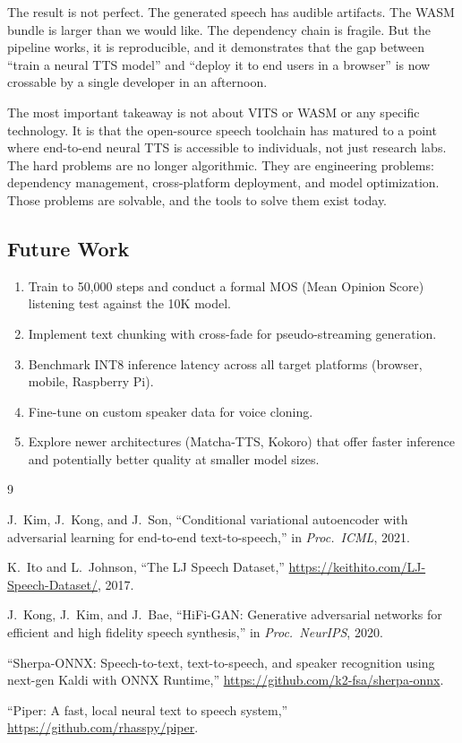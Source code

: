 \documentclass[10pt,a4paper,twocolumn]{article}
\begin{document}
The result is not perfect. The generated speech has audible artifacts. The WASM bundle is larger than we would like. The dependency chain is fragile. But the pipeline works, it is reproducible, and it demonstrates that the gap between ``train a neural TTS model'' and ``deploy it to end users in a browser'' is now crossable by a single developer in an afternoon.

The most important takeaway is not about VITS or WASM or any specific technology. It is that the open-source speech toolchain has matured to a point where end-to-end neural TTS is accessible to individuals, not just research labs. The hard problems are no longer algorithmic. They are engineering problems: dependency management, cross-platform deployment, and model optimization. Those problems are solvable, and the tools to solve them exist today.

\subsection{Future Work}

\begin{enumerate}[nosep]
    \item Train to 50,000 steps and conduct a formal MOS (Mean Opinion Score) listening test against the 10K model.
    \item Implement text chunking with cross-fade for pseudo-streaming generation.
    \item Benchmark INT8 inference latency across all target platforms (browser, mobile, Raspberry Pi).
    \item Fine-tune on custom speaker data for voice cloning.
    \item Explore newer architectures (Matcha-TTS, Kokoro) that offer faster inference and potentially better quality at smaller model sizes.
\end{enumerate}

\begin{thebibliography}{9}

J.~Kim, J.~Kong, and J.~Son,
``Conditional variational autoencoder with adversarial learning for end-to-end text-to-speech,''
in \emph{Proc.\ ICML}, 2021.

K.~Ito and L.~Johnson,
``The LJ Speech Dataset,''
\url{https://keithito.com/LJ-Speech-Dataset/}, 2017.

J.~Kong, J.~Kim, and J.~Bae,
``HiFi-GAN: Generative adversarial networks for efficient and high fidelity speech synthesis,''
in \emph{Proc.\ NeurIPS}, 2020.

``Sherpa-ONNX: Speech-to-text, text-to-speech, and speaker recognition using next-gen Kaldi with ONNX Runtime,''
\url{https://github.com/k2-fsa/sherpa-onnx}.

``Piper: A fast, local neural text to speech system,''
\url{https://github.com/rhasspy/piper}.

\end{thebibliography}
\end{document}
